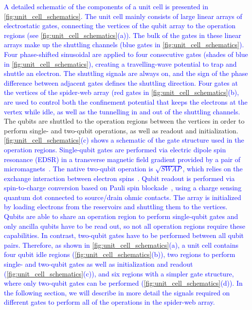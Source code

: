 \documentclass[aps,prl,reprint,superscriptaddress,floatfix]{revtex4-1}
\begin{document}
\textcolor{blue}{
  A detailed schematic of the components of a unit cell is presented in \autoref{fig:unit_cell_schematics}.
  The unit cell mainly consists of large linear arrays of electrostatic gates, connecting the vertices of the qubit array to the operation regions (see \autoref{fig:unit_cell_schematics}(a)).
  The bulk of the gates in these linear arrays make up the shuttling channels (blue gates in \autoref{fig:unit_cell_schematics}).
  Four phase-shifted sinusoidal are applied to four consecutive gates (shades of blue in \autoref{fig:unit_cell_schematics}), creating a travelling-wave potential to trap and shuttle an electron.
  The shuttling signals are always on, and the sign of the phase difference between adjacent gates defines the shuttling direction.
  Four gates at the vertices of the spider-web array (red gates in \autoref{fig:unit_cell_schematics}(b), are used to control both the confinement potential that keeps the electrons at the vertex while idle, as well as the tunnelling in and out of the shuttling channels.
}
The qubits are shuttled to the operation regions between the vertices  in order to perform single- and two-qubit operations, as well as readout and initialization.
\textcolor{blue}{
  \autoref{fig:unit_cell_schematics}(c) shows a schematic of the gate structure used in the operation regions.  
  Single-qubit gates are performed via electric dipole spin resonance (EDSR) in a transverse magnetic field gradient provided by a pair of micromagnets~\cite{Pioro-Ladriere2007}.
  The native two-qubit operation is $\sqrt{SWAP}$, which relies on the exchange interaction between  electron spins~\cite{Loss1998,Divincenzo2000,Nielsen2016}.
  Qubit readout is performed via spin-to-charge conversion based on Pauli spin blockade~\cite{Zwanenburg2013}, using a charge sensing quantum dot connected to source/drain ohmic contacts.
  The array is initialized by loading electrons from the reservoirs and shuttling them to the vertices.
  Qubits are able to share an operation region to perform single-qubit gates and only ancilla qubits have to be read out, so not all operation regions require these capabilities.
  In contrast, two-qubit gates have to be performed between all qubit pairs.
  Therefore, as shown in \autoref{fig:unit_cell_schematics}(a), a unit cell contains four qubit idle regions (\autoref{fig:unit_cell_schematics}(b)), two regions to perform single- and two-qubit gates as well as initialization and readout (\autoref{fig:unit_cell_schematics}(c)), and six regions with a simpler gate structure, where only two-qubit gates can be performed (\autoref{fig:unit_cell_schematics}(d)).
  In the following section, we will describe in more detail the signals required on different gates to perform all of the operations in the spider-web array.
}
\end{document}
